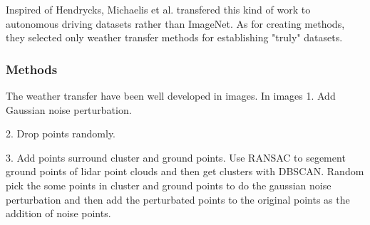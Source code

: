 Inspired of Hendrycks, Michaelis et al.\cite{michaelis_benchmarking_2020} transfered this kind of work to autonomous driving datasets\cite{cordts_cityscapes_2016} rather than ImageNet\cite{deng_imagenet_2009}. As for creating methods, they selected only weather transfer methods for establishing "truly" datasets.
\subsubsection{Methods}
The weather transfer have been well developed in images. In images
 1. Add Gaussian noise perturbation.

2. Drop points randomly.

3. Add points surround cluster and ground points. Use RANSAC to segement ground points of lidar point clouds and then get clusters with DBSCAN. Random pick the some points in cluster and ground points to do the gaussian noise perturbation and then add the perturbated points to the original points as the addition of noise points.
